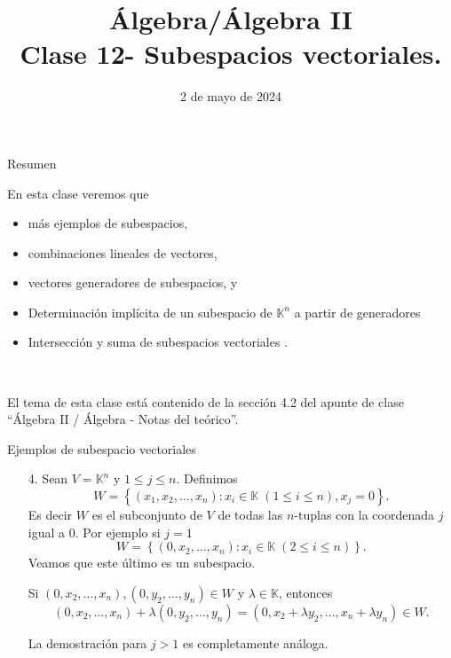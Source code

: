 \documentclass[handout]{beamer} %
\title[Clase 12 - Subespacios vectoriales]{Álgebra/Álgebra II \\ Clase 12- Subespacios vectoriales.}
\author[]{}
\institute[]{\normalsize FAMAF / UNC
	\\[\baselineskip] ${}^{}$
	\\[\baselineskip]
}
\date[02/05/2024]{2 de mayo de 2024}
\newcommand{\K}{\mathbb K}
\begin{document}
\begin{frame}
\maketitle
\end{frame}


\begin{frame}{Resumen}

    En esta clase veremos que
    \begin{itemize}
    \item más ejemplos de subespacios, 
        \item combinaciones lineales de vectores,
        \item vectores generadores de subespacios,  y
        \item Determinación implícita de un subespacio de $\mathbb{K}^n$ a
        partir de generadores
        \item Intersección y suma de subespacios vectoriales . 
    \end{itemize}
    

\

El tema de esta clase  está contenido de la sección 4.2 del apunte de clase ``Álgebra II / Álgebra - Notas del teórico''.
\end{frame}


    \begin{frame}{Ejemplos de subespacio vectoriales}
    
    
        \begin{enumerate}     
            \item[4.] Sean $V=\K^n$ y $1\le j \le n$. Definimos 
            $$
            W = \left\{ (x_1,x_2,\ldots,x_n): x_i \in \K\; (1 \le i \le n), x_j =0\right\}.
            $$
            Es decir $W$  es el subconjunto de $V$ de todas las $n$-tuplas con la coordenada $j$ igual a 0. Por ejemplo  si $j=1$ 
            $$
            W = \left\{ (0,x_2,\ldots,x_n): x_i \in \K \;(2 \le i \le n)\right\}.
            $$
            \pause
            Veamos que este último es un subespacio.
            
            Si $(0,x_2,\ldots,x_n), (0,y_2,\ldots,y_n) \in W$ y  $\lambda \in \K$,  entonces
            $$(0,x_2,\ldots,x_n)+ \lambda(0,y_2,\ldots,y_n) = (0,x_2+\lambda y_2,\ldots,x_n+\lambda y_n) \in W.$$
            
            
            La demostración para $j >1$ es completamente análoga. 
        \end{enumerate}

    
    \end{frame}
    
\end{document}
